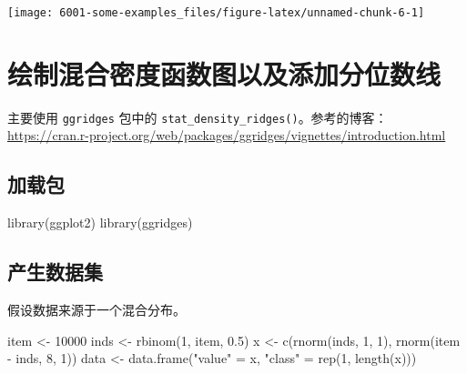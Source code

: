 \documentclass[
]{book}
\newenvironment{Shaded}{\begin{snugshade}}{\end{snugshade}}
\newcommand{\DecValTok}[1]{\textcolor[rgb]{0.00,0.00,0.81}{#1}}
\newcommand{\FloatTok}[1]{\textcolor[rgb]{0.00,0.00,0.81}{#1}}
\newcommand{\FunctionTok}[1]{\textcolor[rgb]{0.00,0.00,0.00}{#1}}
\newcommand{\NormalTok}[1]{#1}
\newcommand{\OtherTok}[1]{\textcolor[rgb]{0.56,0.35,0.01}{#1}}
\newcommand{\SpecialCharTok}[1]{\textcolor[rgb]{0.00,0.00,0.00}{#1}}
\newcommand{\StringTok}[1]{\textcolor[rgb]{0.31,0.60,0.02}{#1}}
\begin{document}
\begin{center}\texttt{[image: 6001-some-examples\_files/figure-latex/unnamed-chunk-6-1]} \end{center}

\hypertarget{ux7ed8ux5236ux6df7ux5408ux5bc6ux5ea6ux51fdux6570ux56feux4ee5ux53caux6dfbux52a0ux5206ux4f4dux6570ux7ebf}{%
\section{绘制混合密度函数图以及添加分位数线}\label{ux7ed8ux5236ux6df7ux5408ux5bc6ux5ea6ux51fdux6570ux56feux4ee5ux53caux6dfbux52a0ux5206ux4f4dux6570ux7ebf}}

主要使用 \texttt{ggridges} 包中的 \texttt{stat\_density\_ridges()}。参考的博客：\url{https://cran.r-project.org/web/packages/ggridges/vignettes/introduction.html}

\hypertarget{ux52a0ux8f7dux5305}{%
\subsection{加载包}\label{ux52a0ux8f7dux5305}}

\begin{Shaded}
\begin{Highlighting}[]
\FunctionTok{library}\NormalTok{(ggplot2)}
\FunctionTok{library}\NormalTok{(ggridges)}
\end{Highlighting}
\end{Shaded}

\hypertarget{ux4ea7ux751fux6570ux636eux96c6}{%
\subsection{产生数据集}\label{ux4ea7ux751fux6570ux636eux96c6}}

假设数据来源于一个混合分布。

\begin{Shaded}
\begin{Highlighting}[]
\NormalTok{item }\OtherTok{\textless{}{-}} \DecValTok{10000}
\NormalTok{inds }\OtherTok{\textless{}{-}} \FunctionTok{rbinom}\NormalTok{(}\DecValTok{1}\NormalTok{, item, }\FloatTok{0.5}\NormalTok{)}
\NormalTok{x }\OtherTok{\textless{}{-}} \FunctionTok{c}\NormalTok{(}\FunctionTok{rnorm}\NormalTok{(inds, }\DecValTok{1}\NormalTok{, }\DecValTok{1}\NormalTok{), }\FunctionTok{rnorm}\NormalTok{(item }\SpecialCharTok{{-}}\NormalTok{ inds, }\DecValTok{8}\NormalTok{, }\DecValTok{1}\NormalTok{))}
\NormalTok{data }\OtherTok{\textless{}{-}} \FunctionTok{data.frame}\NormalTok{(}\StringTok{"value"} \OtherTok{=}\NormalTok{ x, }\StringTok{"class"} \OtherTok{=} \FunctionTok{rep}\NormalTok{(}\DecValTok{1}\NormalTok{, }\FunctionTok{length}\NormalTok{(x)))}
\end{Highlighting}
\end{Shaded}
\end{document}
